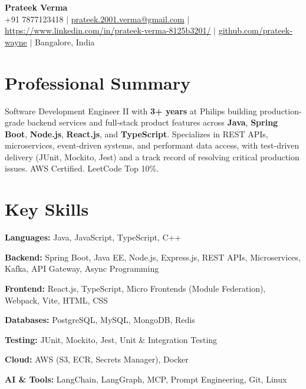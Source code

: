 \documentclass[letterpaper,10.5pt]{article}
\begin{document}
\begin{center}
  {\LARGE \textbf{Prateek Verma}} \\[2pt]
  +91 7877123418 \;$|$\;
  \href{mailto:prateek.2001.verma@gmail.com}{prateek.2001.verma@gmail.com} \;$|$\;
  \href{linkedin}{https://www.linkedin.com/in/prateek-verma-8125b3201/} \;$|$\;
  \href{https://github.com/Prateek-Wayne}{github.com/prateek-wayne} \;$|$\;
  Bangalore, India
\end{center}

\section{Professional Summary}
\small{
Software Development Engineer II with \textbf{3+ years} at Philips building production-grade backend services and full-stack product features across \textbf{Java}, \textbf{Spring Boot}, \textbf{Node.js}, \textbf{React.js}, and \textbf{TypeScript}. Specializes in REST APIs, microservices, event-driven systems, and performant data access, with test-driven delivery (JUnit, Mockito, Jest) and a track record of resolving critical production issues. AWS Certified. LeetCode Top 10\%.
}

\section{Key Skills}
\begin{itemize}[leftmargin=0.15in, label={}, itemsep=-1pt]
  \small{
    \item \textbf{Languages:} Java, JavaScript, TypeScript, C++
    \item \textbf{Backend:} Spring Boot, Java EE, Node.js, Express.js, REST APIs, Microservices, Kafka, API Gateway, Async Programming
    \item \textbf{Frontend:} React.js, TypeScript, Micro Frontends (Module Federation), Webpack, Vite, HTML, CSS
    \item \textbf{Databases:} PostgreSQL, MySQL, MongoDB, Redis
    \item \textbf{Testing:} JUnit, Mockito, Jest, Unit \& Integration Testing
    \item \textbf{Cloud:} AWS (S3, ECR, Secrets Manager), Docker
    \item \textbf{AI \& Tools:} LangChain, LangGraph, MCP, Prompt Engineering, Git, Linux
  }
\end{itemize}
\end{document}
